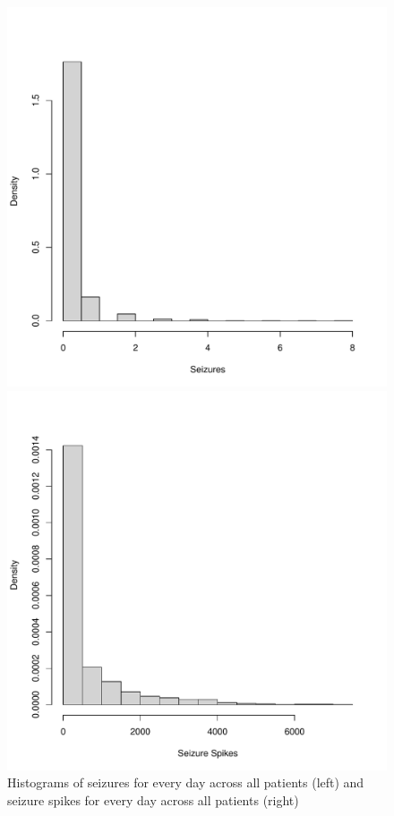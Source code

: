 \begin{figure}
  \begin{minipage}[b]{0.5\linewidth}
    \centering
     \includegraphics[width=\linewidth]{chapters/CodingBasics/figures/daily_le_histogram.pdf}

  \end{minipage}
  \begin{minipage}[b]{0.5\linewidth}
    \centering
     \includegraphics[width=\linewidth]{chapters/CodingBasics/figures/daily_iea_lead_agg.pdf}
  \end{minipage}
  \label{fig:daily_seizures}
  \caption{Histograms of seizures for every day across all patients (left) and seizure spikes for every day across all patients (right)}
\end{figure}

